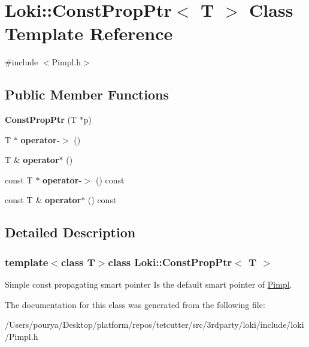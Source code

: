 \hypertarget{structLoki_1_1ConstPropPtr}{}\section{Loki\+:\+:Const\+Prop\+Ptr$<$ T $>$ Class Template Reference}
\label{structLoki_1_1ConstPropPtr}


{\ttfamily \#include $<$Pimpl.\+h$>$}

\subsection*{Public Member Functions}
\begin{DoxyCompactItemize}
\item 
\hypertarget{structLoki_1_1ConstPropPtr_adc5c498de4bbd31b9e249f4adcc567c7}{}{\bfseries Const\+Prop\+Ptr} (T $\ast$p)\label{structLoki_1_1ConstPropPtr_adc5c498de4bbd31b9e249f4adcc567c7}

\item 
\hypertarget{structLoki_1_1ConstPropPtr_aa93f88ffd1fbb3e158d2849339d9b45d}{}T $\ast$ {\bfseries operator-\/$>$} ()\label{structLoki_1_1ConstPropPtr_aa93f88ffd1fbb3e158d2849339d9b45d}

\item 
\hypertarget{structLoki_1_1ConstPropPtr_a9df877a45750b7a701f262430418cd29}{}T \& {\bfseries operator$\ast$} ()\label{structLoki_1_1ConstPropPtr_a9df877a45750b7a701f262430418cd29}

\item 
\hypertarget{structLoki_1_1ConstPropPtr_a0f2a0e99cfdd3c24027c13c9ce2fa33e}{}const T $\ast$ {\bfseries operator-\/$>$} () const \label{structLoki_1_1ConstPropPtr_a0f2a0e99cfdd3c24027c13c9ce2fa33e}

\item 
\hypertarget{structLoki_1_1ConstPropPtr_a29462945f5b52a5208c4403650e85a90}{}const T \& {\bfseries operator$\ast$} () const \label{structLoki_1_1ConstPropPtr_a29462945f5b52a5208c4403650e85a90}

\end{DoxyCompactItemize}


\subsection{Detailed Description}
\subsubsection*{template$<$class T$>$class Loki\+::\+Const\+Prop\+Ptr$<$ T $>$}

Simple const propagating smart pointer Is the default smart pointer of \hyperlink{classLoki_1_1Pimpl}{Pimpl}. 

The documentation for this class was generated from the following file\+:\begin{DoxyCompactItemize}
\item 
/\+Users/pourya/\+Desktop/platform/repos/tetcutter/src/3rdparty/loki/include/loki/Pimpl.\+h\end{DoxyCompactItemize}
